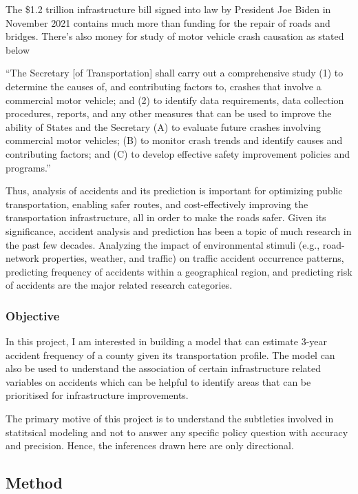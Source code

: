 \documentclass[
]{article}
\begin{document}
The \$1.2 trillion infrastructure bill signed into law by President Joe
Biden in November 2021 contains much more than funding for the repair of
roads and bridges. There's also money for study of motor vehicle crash
causation as stated below

``The Secretary {[}of Transportation{]} shall carry out a comprehensive
study (1) to determine the causes of, and contributing factors to,
crashes that involve a commercial motor vehicle; and (2) to identify
data requirements, data collection procedures, reports, and any other
measures that can be used to improve the ability of States and the
Secretary (A) to evaluate future crashes involving commercial motor
vehicles; (B) to monitor crash trends and identify causes and
contributing factors; and (C) to develop effective safety improvement
policies and programs.''

Thus, analysis of accidents and its prediction is important for
optimizing public transportation, enabling safer routes, and
cost-effectively improving the transportation infrastructure, all in
order to make the roads safer. Given its significance, accident analysis
and prediction has been a topic of much research in the past few
decades. Analyzing the impact of environmental stimuli (e.g.,
road-network properties, weather, and traffic) on traffic accident
occurrence patterns, predicting frequency of accidents within a
geographical region, and predicting risk of accidents are the major
related research categories.

\hypertarget{objective}{%
\subsubsection{Objective}\label{objective}}

In this project, I am interested in building a model that can estimate
3-year accident frequency of a county given its transportation profile.
The model can also be used to understand the association of certain
infrastructure related variables on accidents which can be helpful to
identify areas that can be prioritised for infrastructure improvements.

The primary motive of this project is to understand the subtleties
involved in statitsical modeling and not to answer any specific policy
question with accuracy and precision. Hence, the inferences drawn here
are only directional.

\hypertarget{method}{%
\subsection{Method}\label{method}}
\end{document}
